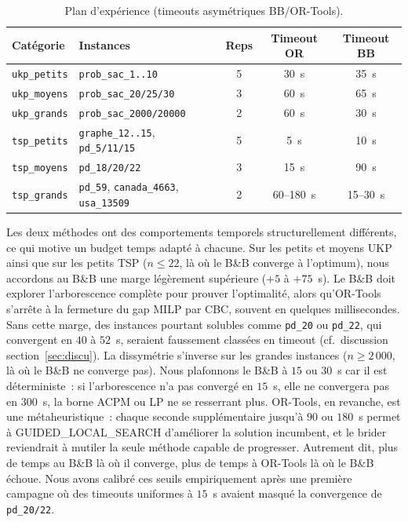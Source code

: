 \documentclass[11pt,a4paper]{article}
\begin{document}
\begin{table}[!htbp]
\centering
\small
\setlength{\tabcolsep}{6pt}
\begin{tabular}{llccc}
\toprule
\textbf{Catégorie} & \textbf{Instances} & \textbf{Reps} & \textbf{Timeout OR} & \textbf{Timeout BB} \\
\midrule
\texttt{ukp\_petits} & \texttt{prob\_sac\_1..10} & 5 & 30~s & 35~s \\
\texttt{ukp\_moyens} & \texttt{prob\_sac\_20/25/30} & 3 & 60~s & 65~s \\
\texttt{ukp\_grands} & \texttt{prob\_sac\_2000/20000} & 2 & 60~s & 30~s \\
\texttt{tsp\_petits} & \texttt{graphe\_12..15}, \texttt{pd\_5/11/15} & 5 & 5~s & 10~s \\
\texttt{tsp\_moyens} & \texttt{pd\_18/20/22} & 3 & 15~s & 90~s \\
\texttt{tsp\_grands} & \texttt{pd\_59}, \texttt{canada\_4663}, \texttt{usa\_13509} & 2 & 60--180~s & 15--30~s \\
\bottomrule
\end{tabular}
\caption{Plan d'expérience (timeouts asymétriques BB/OR-Tools).}
\label{tab:plan_exp}
\end{table}

Les deux méthodes ont des comportements temporels structurellement différents, ce qui motive un budget temps adapté à chacune. Sur les petits et moyens UKP ainsi que sur les petits TSP ($n \leq 22$, là où le B\&B converge à l'optimum), nous accordons au B\&B une marge légèrement supérieure ($+5$ à $+75$~s). Le B\&B doit explorer l'arborescence complète pour prouver l'optimalité, alors qu'OR-Tools s'arrête à la fermeture du gap MILP par CBC, souvent en quelques millisecondes. Sans cette marge, des instances pourtant solubles comme \texttt{pd\_20} ou \texttt{pd\_22}, qui convergent en $40$ à $52$~s, seraient faussement classées en timeout (cf.~discussion section~\ref{sec:discu}). La dissymétrie s'inverse sur les grandes instances ($n \geq 2\,000$, là où le B\&B ne converge pas). Nous plafonnons le B\&B à $15$ ou $30$~s car il est déterministe~: si l'arborescence n'a pas convergé en $15$~s, elle ne convergera pas en $300$~s, la borne ACPM ou LP ne se resserrant plus. OR-Tools, en revanche, est une métaheuristique~: chaque seconde supplémentaire jusqu'à $90$ ou $180$~s permet à GUIDED\_LOCAL\_SEARCH d'améliorer la solution incumbent, et le brider reviendrait à mutiler la seule méthode capable de progresser. Autrement dit, plus de temps au B\&B là où il converge, plus de temps à OR-Tools là où le B\&B échoue. Nous avons calibré ces seuils empiriquement après une première campagne où des timeouts uniformes à $15$~s avaient masqué la convergence de \texttt{pd\_20/22}.
\end{document}
